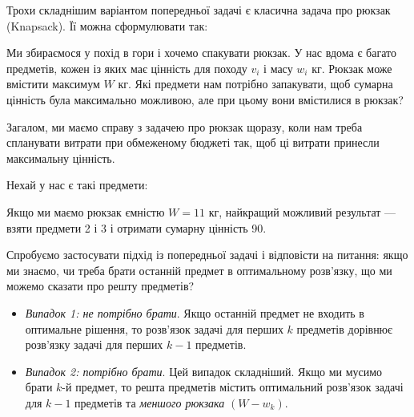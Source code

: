 \documentclass[12pt,a4paper]{report}
\begin{document}
Трохи складнішим варіантом попередньої задачі є класична задача про рюкзак (Knapsack). Її можна сформулювати так:

Ми збираємося у похід в гори і хочемо спакувати рюкзак. У нас вдома є багато предметів, кожен із яких має цінність для походу \(v_i\) і масу \(w_i\) кг. Рюкзак може вмістити максимум \(W\) кг. Які предмети нам потрібно запакувати, щоб сумарна цінність була максимально можливою, але при цьому вони вмістилися в рюкзак?

Загалом, ми маємо справу з задачею про рюкзак щоразу, коли нам треба спланувати витрати при обмеженому бюджеті так, щоб ці витрати принесли максимальну цінність.

Нехай у нас є такі предмети:

\begin{center}
\end{center}

Якщо ми маємо рюкзак ємністю \(W = 11\) кг, найкращий можливий результат --- взяти предмети 2 і 3 і отримати сумарну цінність 90.

Спробуємо застосувати підхід із попередньої задачі і відповісти на питання: якщо ми знаємо, чи треба брати останній предмет в оптимальному розв’язку, що ми можемо сказати про решту предметів?

\begin{itemize}
    \item \emph{Випадок 1: не потрібно брати}. Якщо останній предмет не входить в оптимальне рішення, то розв’язок задачі для перших \(k\) предметів дорівнює розв’язку задачі для перших \(k - 1\) предметів.
    \item \emph{Випадок 2: потрібно брати}. Цей випадок складніший. Якщо ми мусимо брати \(k\)-й предмет, то решта предметів містить оптимальний розв’язок задачі для \(k - 1\) предметів та \emph{меншого рюкзака} \((W - w_k)\).
\end{itemize}
\end{document}
